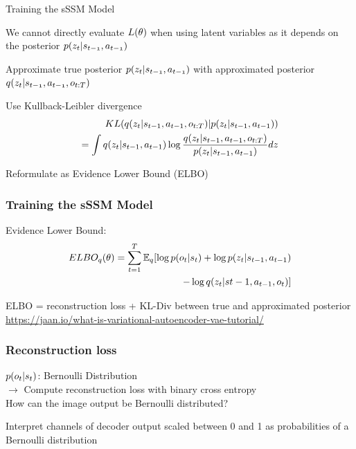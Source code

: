 \begin{frame}{Training the sSSM Model}
		\begin{PraesentationAufzaehlung}
			\item We cannot directly evaluate $\mathnormal{L(\theta)}$ when using latent variables as it depends on the posterior $\mathnormal{p(z_t|s_{t-1},a_{t-1})}$
			\item Approximate true posterior $\mathnormal{p(z_t|s_{t-1},a_{t-1})}$ with approximated posterior $\mathnormal{q(z_t|s_{t-1},a_{t-1},o_{t:T})}$
			\item Use Kullback-Leibler divergence
			\begin{equation}
			\mathnormal{
			\begin{aligned}
			KL(q(z_t|s_{t-1},a_{t-1},o_{t:T})|p(z_t|s_{t-1},a_{t-1})) \\= \int q(z_t|s_{t-1},a_{t-1}) \log \frac{q(z_t|s_{t-1},a_{t-1},o_{t:T})}{p(z_t|s_{t-1},a_{t-1})}dz
			\end{aligned}	
			}		
			\end{equation}
			\item Reformulate as Evidence Lower Bound (ELBO)
		\end{PraesentationAufzaehlung}
\end{frame}

\begin{frame}
	\frametitle{Training the sSSM Model}
		\vspace{-10mm}
        Evidence Lower Bound:
        \begin{equation}
		\mathnormal{
        \begin{aligned}
            ELBO_q(\theta) = \sum_{t=1}^T \operatorname{\mathbb{E}}_q[\log p(o_t|s_t) + \log p(z_t|s_{t-1}, a_{t-1})\\ - \log q(z_t|s{t-1}, a_{t-1}, o_t)]
        \end{aligned}
		}
        \end{equation}
        
        ELBO = reconstruction loss + KL-Div between true and approximated posterior\\
        \vspace{10mm}
        \href{https://jaan.io/what-is-variational-autoencoder-vae-tutorial/}{https://jaan.io/what-is-variational-autoencoder-vae-tutorial/}
\end{frame}

\begin{frame}
	\frametitle{Reconstruction loss}
	$\mathnormal{p(o_t|s_t)}$: Bernoulli Distribution \\
        $\rightarrow$ Compute reconstruction loss with binary cross entropy\\
        \vspace{10mm}
	How can the image output be Bernoulli distributed?
        \begin{PraesentationAufzaehlung}
        	\item Interpret channels of decoder output scaled between 0 and 1 as probabilities of a Bernoulli distribution
        	
        \end{PraesentationAufzaehlung}
\end{frame}


